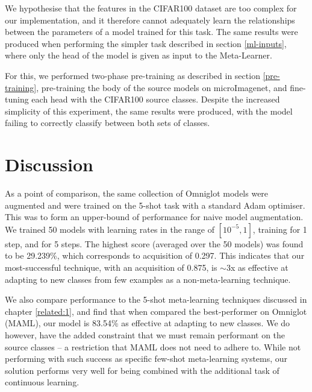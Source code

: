 \documentclass{report}
\begin{document}
We hypothesise that the features in the CIFAR100 dataset are too complex for our implementation, and it therefore cannot adequately learn the relationships between the parameters of a model trained for this task. The same results were produced when performing the simpler task described in section \ref{ml-inputs}, where only the head of the model is given as input to the Meta-Learner. \par
For this, we performed two-phase pre-training as described in section \ref{pre-training}, pre-training the body of the source models on microImagenet, and fine-tuning each head with the CIFAR100 source classes. Despite the increased simplicity of this experiment, the same results were produced, with the model failing to correctly classify between both sets of classes. \par


\section{Discussion}
As a point of comparison, the same collection of Omniglot models were augmented and were trained on the 5-shot task with a standard Adam optimiser. This was to form an upper-bound of performance for naive model augmentation. We trained 50 models with learning rates in the range of $[10^{-5}, 1]$, training for 1 step, and for 5 steps. The highest score (averaged over the 50 models) was found to be 29.239\%, which corresponds to acquisition of 0.297. This indicates that our most-successful technique, with an acquisition of 0.875, is $\sim$3x as effective at adapting to new classes from few examples as a non-meta-learning technique. \par
We also compare performance to the 5-shot meta-learning techniques discussed in chapter \ref{related:1}, and find that when compared the best-performer on Omniglot (MAML\parencite{maml}), our model is 83.54\% as effective at adapting to new classes. We do however, have the added constraint that we must remain performant on the source classes -- a restriction that MAML does not need to adhere to. While not performing with such success as specific few-shot meta-learning systems, our solution performs very well for being combined with the additional task of continuous learning. \par
\end{document}
